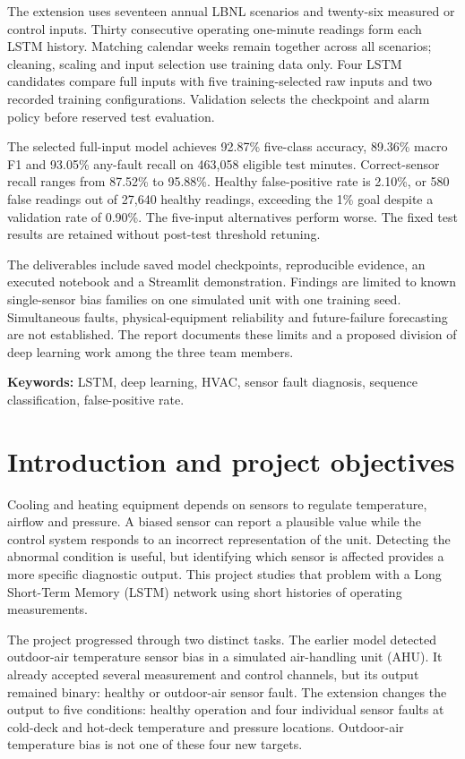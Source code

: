 The extension uses seventeen annual LBNL scenarios and twenty-six measured or control inputs. Thirty consecutive operating one-minute readings form each LSTM history. Matching calendar weeks remain together across all scenarios; cleaning, scaling and input selection use training data only. Four LSTM candidates compare full inputs with five training-selected raw inputs and two recorded training configurations. Validation selects the checkpoint and alarm policy before reserved test evaluation.

The selected full-input model achieves 92.87\% five-class accuracy, 89.36\% macro F1 and 93.05\% any-fault recall on 463,058 eligible test minutes. Correct-sensor recall ranges from 87.52\% to 95.88\%. Healthy false-positive rate is 2.10\%, or 580 false readings out of 27,640 healthy readings, exceeding the 1\% goal despite a validation rate of 0.90\%. The five-input alternatives perform worse. The fixed test results are retained without post-test threshold retuning.

The deliverables include saved model checkpoints, reproducible evidence, an executed notebook and a Streamlit demonstration. Findings are limited to known single-sensor bias families on one simulated unit with one training seed. Simultaneous faults, physical-equipment reliability and future-failure forecasting are not established. The report documents these limits and a proposed division of deep learning work among the three team members.

\textbf{Keywords:} LSTM, deep learning, HVAC, sensor fault diagnosis, sequence classification, false-positive rate.
\clearpage
{}
\hypersetup{pageanchor=true}
\tableofcontents
\clearpage
\listoftables
\listoffigures
\clearpage
{}

\section{Introduction and project objectives}
Cooling and heating equipment depends on sensors to regulate temperature, airflow and pressure. A biased sensor can report a plausible value while the control system responds to an incorrect representation of the unit. Detecting the abnormal condition is useful, but identifying which sensor is affected provides a more specific diagnostic output. This project studies that problem with a Long Short-Term Memory (LSTM) network using short histories of operating measurements.

The project progressed through two distinct tasks. The earlier model detected outdoor-air temperature sensor bias in a simulated air-handling unit (AHU). It already accepted several measurement and control channels, but its output remained binary: healthy or outdoor-air sensor fault. The extension changes the output to five conditions: healthy operation and four individual sensor faults at cold-deck and hot-deck temperature and pressure locations. Outdoor-air temperature bias is not one of these four new targets.


